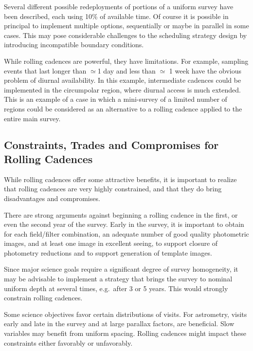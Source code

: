 Several different possible redeployments of portions of a uniform survey
have been described, each using 10\% of available time.  Of course it is
possible in principal to implement multiple options, sequentially or
maybe in parallel in some cases. This may pose considerable challenges
to the scheduling strategy design by introducing incompatible boundary
conditions.

While rolling cadences are powerful, they have limitations.  For
example, sampling events that last longer than $\simeq$1 day and less
than $\simeq$ 1 week have the obvious problem of diurnal availability.
In this example, intermediate cadences could be implemented in the
circumpolar region, where diurnal access is much extended.  This is an
example of a case in which a mini-survey of a limited number of regions
could be considered as an alternative to a rolling cadence applied to
the entire main survey.



\subsection{Constraints, Trades and Compromises for Rolling Cadences}
\label{sec:rolling:trades}

While rolling cadences offer some attractive benefits, it is important
to realize that rolling cadences are very highly constrained, and that
they do bring disadvantages and compromises.

There are strong arguments against beginning a rolling cadence in the
first, or even the second year of the survey.  Early in the survey, it
is important to obtain for each field/filter combination, an adequate
number of good quality photometric images, and at least one image in
excellent seeing, to support closure of photometry reductions and to
support generation of template images.

Since major science goals require a significant degree of survey
homogeneity, it may be advisable to implement a strategy that brings the
survey to nominal uniform depth at several times, e.g.\ after 3 or 5
years.  This would strongly constrain rolling cadences.

Some science objectives favor certain distributions of visits.  For
astrometry, visits early and late in the survey and at large parallax
factors, are beneficial.  Slow variables may benefit from uniform
spacing.  Rolling cadences might impact these constraints either
favorably or unfavorably.

